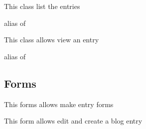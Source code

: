 \documentclass[letterpaper,10pt,english]{sphinxmanual}
\begin{document}

\begin{fulllineitems}
\label{modules/blog:apps.blog.views.EntryList}
This class list the entries

\begin{fulllineitems}
\label{modules/blog:apps.blog.views.EntryList.model}
alias of 

\end{fulllineitems}


\end{fulllineitems}


\begin{fulllineitems}
\label{modules/blog:apps.blog.views.EntryView}
This class allows view an entry

\begin{fulllineitems}
\label{modules/blog:apps.blog.views.EntryView.model}
alias of 

\end{fulllineitems}


\end{fulllineitems}



\subsection{Forms}
\label{modules/blog:forms}
This forms allows make entry forms
\label{modules/blog:module-apps.blog.forms}

\begin{fulllineitems}
\label{modules/blog:apps.blog.forms.BlogForm}
This form allows edit and create a blog entry

\end{fulllineitems}
\end{document}
